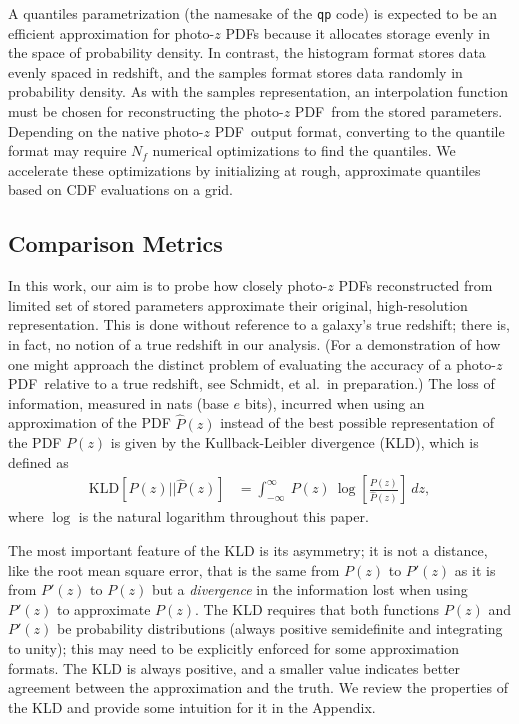 \documentclass[\docopts]{\docclass}
\newcommand{\pz}{photo-$z$ PDF}
\begin{document}
A quantiles parametrization (the namesake of the \texttt{qp} code) is expected 
to be an efficient approximation for \pz s because it allocates storage evenly 
in the space of probability density.
In contrast, the histogram format stores data evenly spaced in redshift, and 
the samples format stores data randomly in probability density.
As with the samples representation, an interpolation function must be chosen 
for reconstructing the \pz\ from the stored parameters.
Depending on the native \pz\ output format, converting to the quantile format 
may require $N_{f}$ numerical optimizations to find the quantiles.
We accelerate these optimizations by initializing at rough, approximate 
quantiles based on CDF evaluations on a grid.





\subsection{Comparison Metrics}
\label{sec:metric}

In this work, our aim is to probe how closely \pz s reconstructed from limited 
set of stored parameters approximate their original, high-resolution 
representation.
This is done without reference to a galaxy's true redshift; there is, in fact, 
no notion of a true redshift in our analysis.
(For a demonstration of how one might approach the distinct problem of 
evaluating the accuracy of a \pz\ relative to a true redshift, see Schmidt, et 
al.\ in preparation.)
The loss of information, measured in nats (base $e$ bits), incurred when using 
an approximation of the PDF $\hat{P}(z)$ instead of the best possible 
representation of the  PDF $P(z)$ is given by the Kullback-Leibler divergence 
(KLD), which is defined as
\begin{align}
  \label{eq:kld}
  \mathrm{KLD}[P(z) || \hat{P}(z)] &= \int_{-\infty}^{\infty}\ P(z)\ 
\log\left[\frac{P(z)}{\hat{P}(z)}\right]\ dz,
\end{align}
where $\log$ is the natural logarithm throughout this paper.

The most important feature of the KLD is its asymmetry; it is not a distance, 
like the root mean square error, that is the same from $P(z)$ to $P'(z)$ as it 
is from $P'(z)$ to $P(z)$ but a \textit{divergence} in the information lost 
when using $P'(z)$ to approximate $P(z)$.
The KLD requires that both functions $P(z)$ and $P'(z)$ be probability 
distributions (always positive semidefinite and integrating to unity); this may 
need to be explicitly enforced for some approximation formats.
The KLD is always positive, and a smaller value indicates better agreement 
between the approximation and the truth.
We review the properties of the KLD and provide some intuition for it in the 
Appendix.
\end{document}
